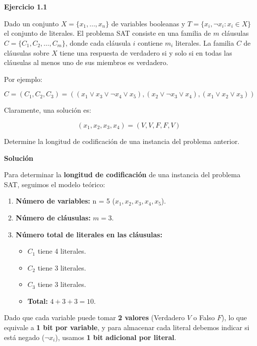 \documentclass[12pt]{article}
\begin{document}
\section{}
{
    \subsection{}
    {

    \textbf{Ejercicio 1.1}

Dado un conjunto $X = \{x_1, \dots, x_n\}$ de variables booleanas y $T = \{x_i, \neg x_i : x_i \in X\}$ el conjunto de literales.  
El problema SAT consiste en una familia de $m$ cláusulas $C = \{C_1, C_2, \dots, C_m\}$, donde cada cláusula $i$ contiene $m_i$ literales.  
La familia $C$ de cláusulas sobre $X$ tiene una respuesta de verdadero si y solo si en todas las cláusulas al menos uno de sus miembros es verdadero.  

Por ejemplo:

\[
C = (C_1, C_2, C_3) = ((x_1 \lor x_3 \lor \neg x_4 \lor x_5), (x_2 \lor \neg x_3 \lor x_4), (x_1 \lor x_2 \lor x_3))
\]

Claramente, una solución es:

\[
(x_1, x_2, x_3, x_4) = (V, V, F, F, V)
\]

Determine la longitud de codificación de una instancia del problema anterior.

\textbf{Solución}

Para determinar la \textbf{longitud de codificación} de una instancia del problema SAT, seguimos el modelo teórico:

\begin{enumerate}
    \item \textbf{Número de variables:} n = 5 ($x_1, x_2, x_3, x_4, x_5$).
    \item \textbf{Número de cláusulas:} $m = 3$.
    \item \textbf{Número total de literales en las cláusulas:}
    \begin{itemize}
        \item $C_1$ tiene 4 literales.
        \item $C_2$ tiene 3 literales.
        \item $C_3$ tiene 3 literales.
        \item \textbf{Total:} $4 + 3 + 3 = 10$.
    \end{itemize}
\end{enumerate}

Dado que cada variable puede tomar \textbf{2 valores} (Verdadero $V$ o Falso $F$), lo que equivale a \textbf{1 bit por variable}, y para almacenar cada literal debemos indicar si está negado ($\neg x_i$), usamos \textbf{1 bit adicional por literal}.

}}
\end{document}
